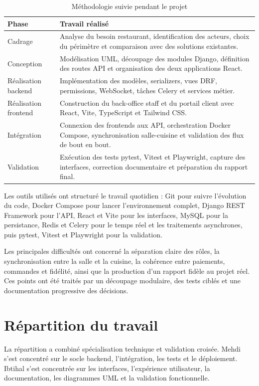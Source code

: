 \begin{table}[H]
\centering
\caption{Méthodologie suivie pendant le projet}
\label{tab:methodologie-travail}
\begin{tabularx}{\textwidth}{p{3cm}Y}
\toprule
\textbf{Phase} & \textbf{Travail réalisé} \\
\midrule
Cadrage & Analyse du besoin restaurant, identification des acteurs, choix du périmètre et comparaison avec des solutions existantes. \\
Conception & Modélisation UML, découpage des modules Django, définition des routes API et organisation des deux applications React. \\
Réalisation backend & Implémentation des modèles, serializers, vues DRF, permissions, WebSocket, tâches Celery et services métier. \\
Réalisation frontend & Construction du back-office staff et du portail client avec React, Vite, TypeScript et Tailwind CSS. \\
Intégration & Connexion des frontends aux API, orchestration Docker Compose, synchronisation salle-cuisine et validation des flux de bout en bout. \\
Validation & Exécution des tests pytest, Vitest et Playwright, capture des interfaces, correction documentaire et préparation du rapport final. \\
\bottomrule
\end{tabularx}
\end{table}

Les outils utilisés ont structuré le travail quotidien : Git pour suivre l'évolution du code, Docker Compose pour lancer l'environnement complet, Django REST Framework pour l'API, React et Vite pour les interfaces, MySQL pour la persistance, Redis et Celery pour le temps réel et les traitements asynchrones, puis pytest, Vitest et Playwright pour la validation.

Les principales difficultés ont concerné la séparation claire des rôles, la synchronisation entre la salle et la cuisine, la cohérence entre paiements, commandes et fidélité, ainsi que la production d'un rapport fidèle au projet réel. Ces points ont été traités par un découpage modulaire, des tests ciblés et une documentation progressive des décisions.

\section{Répartition du travail}
La répartition a combiné spécialisation technique et validation croisée. Mehdi s'est concentré sur le socle backend, l'intégration, les tests et le déploiement. Ibtihal s'est concentrée sur les interfaces, l'expérience utilisateur, la documentation, les diagrammes UML et la validation fonctionnelle.

